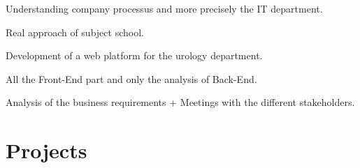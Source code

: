 \documentclass[letterpaper]{deedy-resume} %
\begin{document}
\begin{minipage}[t]{0.66\textwidth}

\begin{tightitemize}
\item Understanding company processus and more precisely the IT department.
\item Real approach of subject school.
\end{tightitemize}

\sectionspace %



\begin{tightitemize}
\item Development of a web platform for the urology department.
\item All the Front-End part and only the analysis of Back-End.
\item Analysis of the business requirements + Meetings with the different stakeholders.
\end{tightitemize}

\sectionspace %


\section{Projects}

\end{minipage}
\end{document}
